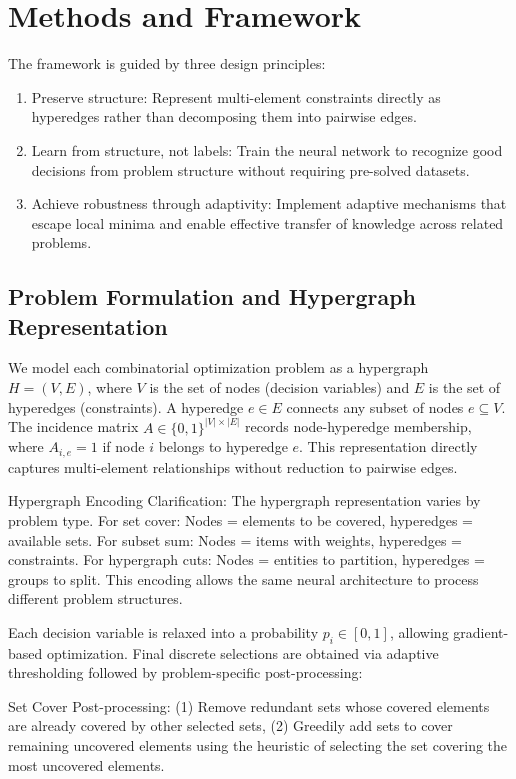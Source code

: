 \documentclass[conference]{IEEEtran}
\begin{document}
\section{Methods and Framework}
The framework is guided by three design principles:
\begin{enumerate}
\item Preserve structure: Represent multi-element constraints directly as hyperedges rather than decomposing them into pairwise edges.
\item Learn from structure, not labels: Train the neural network to recognize good decisions from problem structure without requiring pre-solved datasets.
\item Achieve robustness through adaptivity: Implement adaptive mechanisms that escape local minima and enable effective transfer of knowledge across related problems.
\end{enumerate}

\subsection{Problem Formulation and Hypergraph Representation}
We model each combinatorial optimization problem as a hypergraph \(H = (V, E)\), where \(V\) is the set of nodes (decision variables) and \(E\) is the set of hyperedges (constraints). A hyperedge \(e \in E\) connects any subset of nodes \(e \subseteq V\). The incidence matrix \(A \in \{0,1\}^{|V| \times |E|}\) records node-hyperedge membership, where \(A_{i,e} = 1\) if node \(i\) belongs to hyperedge \(e\). This representation directly captures multi-element relationships without reduction to pairwise edges.

Hypergraph Encoding Clarification: The hypergraph representation varies by problem type. For set cover: Nodes = elements to be covered, hyperedges = available sets. For subset sum: Nodes = items with weights, hyperedges = constraints. For hypergraph cuts: Nodes = entities to partition, hyperedges = groups to split. This encoding allows the same neural architecture to process different problem structures.

Each decision variable is relaxed into a probability \(p_i \in [0,1]\), allowing gradient-based optimization. Final discrete selections are obtained via adaptive thresholding followed by problem-specific post-processing:

Set Cover Post-processing: (1) Remove redundant sets whose covered elements are already covered by other selected sets, (2) Greedily add sets to cover remaining uncovered elements using the heuristic of selecting the set covering the most uncovered elements.
\end{document}
